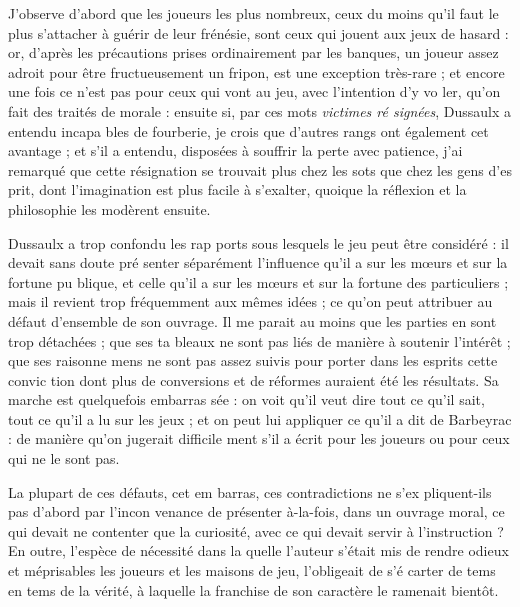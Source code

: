 J'observe d'abord que les joueurs
les plus nombreux, ceux du moins
qu'il faut le plus s'attacher à guérir
de leur frénésie, sont ceux qui jouent
aux jeux de hasard : or, d'après les
précautions prises ordinairement par
les banques, un joueur assez adroit
pour être fructueusement un fripon,
est une exception très-rare ; et encore
une fois ce n'est pas pour ceux qui
vont au jeu, avec l'intention d'y vo%
ler, qu'on fait des traités de morale :
ensuite si, par ces mots \emph{victimes ré%
signées}, Dussaulx a entendu incapa%
bles de fourberie, je crois que d'autres
rangs ont également cet avantage ;
et s'il a entendu, disposées à souffrir
la perte avec patience, j'ai remarqué
que cette résignation se trouvait plus
chez les sots que chez les gens d'es%
prit, dont l'imagination est plus facile
à s'exalter, quoique la réflexion et la
philosophie les modèrent ensuite.

Dussaulx a trop confondu les rap%
ports sous lesquels le jeu peut être
considéré : il devait sans doute pré%
senter séparément l'influence qu'il a
sur les mœurs et sur la fortune pu%
blique, et celle qu'il a sur les mœurs
et sur la fortune des particuliers ;
mais il revient trop fréquemment aux
mêmes idées ; ce qu'on peut attribuer
au défaut d'ensemble de son ouvrage.
Il me parait au moins que les parties
en sont trop détachées ; que ses ta%
bleaux ne sont pas liés de manière à
soutenir l'intérêt ; que ses raisonne%
mens ne sont pas assez suivis pour
porter dans les esprits cette convic%
tion dont plus de conversions et de
réformes auraient été les résultats.
Sa marche est quelquefois embarras%
sée : on voit qu'il veut dire tout ce
qu'il sait, tout ce qu'il a lu sur les
jeux ; et on peut lui appliquer ce qu'il
a dit de Barbeyrac : 
de manière qu'on jugerait difficile%
ment s'il a écrit pour les joueurs ou
pour ceux qui ne le sont pas.

La plupart de ces défauts, cet em%
barras, ces contradictions ne s'ex%
pliquent-ils pas d'abord par l'incon%
venance de présenter à-la-fois, dans
un ouvrage moral, ce qui devait ne
contenter que la curiosité, avec ce
qui devait servir à l'instruction ? En
outre, l'espèce de nécessité dans la%
quelle l'auteur s'était mis de rendre
odieux et méprisables les joueurs et
les maisons de jeu, l'obligeait de s'é%
carter de tems en tems de la vérité, à
laquelle la franchise de son caractère
le ramenait bientôt.

